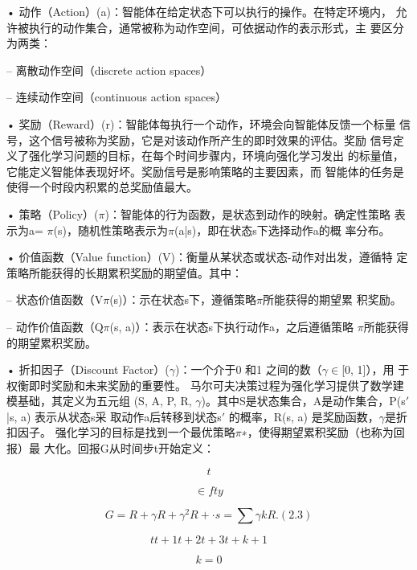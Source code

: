 \documentclass[12pt,a4paper,openright,UTF8]{ctexbook}
\begin{document}
• 动作（Action）(a)：智能体在给定状态下可以执行的操作。在特定环境内，
允许被执行的动作集合，通常被称为动作空间，可依据动作的表示形式，主 要区分为两类：

– 离散动作空间（discrete action spaces）

– 连续动作空间（continuous action spaces）

• 奖励（Reward）(r)：智能体每执行一个动作，环境会向智能体反馈一个标量
信号，这个信号被称为奖励，它是对该动作所产生的即时效果的评估。奖励 信号定义了强化学习问题的目标，在每个时间步骤内，环境向强化学习发出 的标量值，它能定义智能体表现好坏。奖励信号是影响策略的主要因素，而 智能体的任务是使得一个时段内积累的总奖励值最大。

• 策略（Policy）($\pi$)：智能体的行为函数，是状态到动作的映射。确定性策略
表示为a= $\pi$(s)，随机性策略表示为$\pi$(a|s)，即在状态s下选择动作a的概 率分布。

• 价值函数（Value function）(V)：衡量从某状态或状态-动作对出发，遵循特
定策略所能获得的长期累积奖励的期望值。其中：

– 状态价值函数（V$\pi$(s)）：示在状态s下，遵循策略$\pi$所能获得的期望累
积奖励。

– 动作价值函数（Q$\pi$(s, a)）：表示在状态s下执行动作a，之后遵循策略
$\pi$所能获得的期望累积奖励。

• 折扣因子（Discount Factor）($\gamma$)：一个介于0 和1 之间的数（$\gamma$$\in$[0, 1]），用
于权衡即时奖励和未来奖励的重要性。 马尔可夫决策过程为强化学习提供了数学建模基础，其定义为五元组 (S, A, P, R, $\gamma$)。其中S是状态集合，A是动作集合，P(s$'$|s, a) 表示从状态s采 取动作a后转移到状态s$'$ 的概率，R(s, a) 是奖励函数，$\gamma$是折扣因子。 强化学习的目标是找到一个最优策略$\pi$∗，使得期望累积奖励（也称为回报）最 大化。回报G从时间步t开始定义：

\begin{equation*}
t
\end{equation*}

\begin{equation*}
\in fty
\end{equation*}

\begin{equation*}
G= R + \gamma R + \gamma^2R + \cdot s=\sum\gamma kR.(2.3)
\end{equation*}

\begin{equation*}
tt+1t+2t+3t+k+1
\end{equation*}

\begin{equation*}
k=0
\end{equation*}
\end{document}
